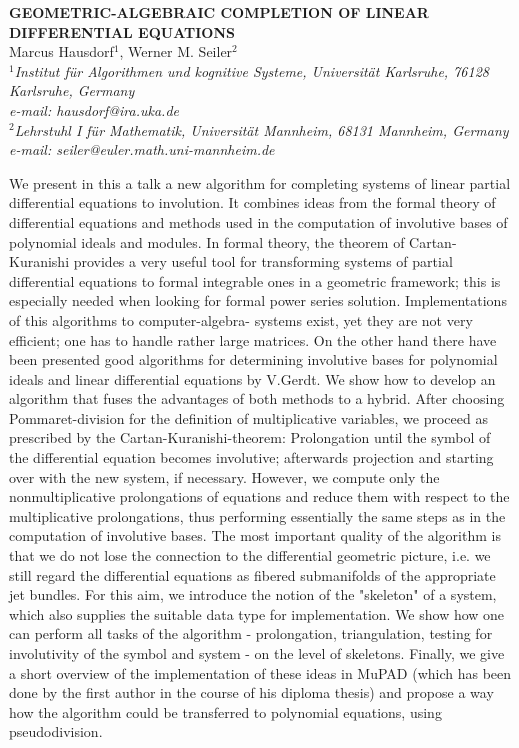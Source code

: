 \documentclass[11pt, draft]{article}
\begin{document}

\begin{center}
{\bf
GEOMETRIC-ALGEBRAIC COMPLETION OF LINEAR DIFFERENTIAL EQUATIONS
}\\
\vspace {0.3cm}
{Marcus Hausdorf$^1$, Werner M. Seiler$^2$}\\
{\it \small$^1$Institut f\"{u}r Algorithmen und kognitive Systeme, Universit\"{a}t
 Karlsruhe, 76128 Karlsruhe, Germany \\ e-mail: hausdorf@ira.uka.de \\
$^2$Lehrstuhl I f\"{u}r Mathematik, Universit\"{a}t Mannheim, 68131 Mannheim,
Germany \\ e-mail: seiler@euler.math.uni-mannheim.de
}
\end{center}
\vspace {0.6cm}
We present in this a talk a new algorithm for completing systems of linear
partial differential equations to involution. It combines ideas from the formal
theory of differential equations and methods used in the computation of
involutive bases of polynomial ideals and modules.
In formal theory, the theorem of Cartan-Kuranishi provides a very useful tool
for transforming systems of partial differential equations to formal integrable
ones in a geometric framework; this is especially needed when looking for formal
power series solution. Implementations of this algorithms to computer-algebra-
systems exist, yet they are not very efficient; one has to handle rather large
matrices. On the other hand there have been presented good algorithms for
determining involutive bases for polynomial ideals and linear differential
equations by V.Gerdt.
We show how to develop an algorithm that fuses the advantages of both methods to
a hybrid. After choosing Pommaret-division for the definition of multiplicative
variables, we proceed as prescribed by the Cartan-Kuranishi-theorem:
Prolongation until the symbol of the differential equation becomes involutive;
afterwards projection and starting over with the new system, if necessary.
However, we compute only the nonmultiplicative prolongations of equations and
reduce them with respect to the multiplicative prolongations, thus performing
essentially the same steps as in the computation of involutive bases.
The most important quality of the algorithm is that we do not lose the
connection to the differential geometric picture, i.e. we still regard the
differential equations as fibered submanifolds of the appropriate jet bundles.
For this aim, we introduce the notion of the "skeleton" of a system, which also
supplies the suitable data type for implementation. We show how one can perform
all tasks of the algorithm - prolongation, triangulation, testing for
involutivity of the symbol and system - on the level of skeletons.
Finally, we give a short overview of the implementation of these ideas in MuPAD
(which has been done by the first author in the course of his diploma thesis)
and propose a way how the algorithm could be transferred to polynomial
equations, using pseudodivision.
\end{document}
